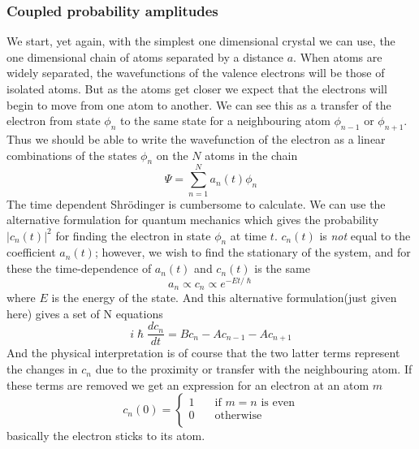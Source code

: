 \documentclass[11pt]{article}
\begin{document}
\subsubsection{Coupled probability amplitudes}
We start, yet again, with the simplest one dimensional crystal we can use, the one dimensional chain of atoms separated by a distance $a$. When atoms are widely separated, the wavefunctions of the valence electrons will be those of isolated atoms. But as the atoms get closer we expect that the electrons will begin to move from one atom to another. We can see this as a transfer of the electron from state $\phi_n$ to the same state for a neighbouring atom $\phi_{n-1}$ or $\phi_{n+1}$. Thus we should be able to write the wavefunction of the electron as a linear combinations of the states $\phi_n$ on the $N$ atoms in the chain
\begin{equation}
	\Psi = \sum^N_{n=1} a_n(t) \phi_n
\end{equation}
The time dependent Shrödinger is cumbersome to calculate. We can use the alternative formulation for quantum mechanics which gives the probability $|c_n(t)|^2$ for finding the electron in state $\phi_n$ at time $t$. $c_n(t)$ is \emph{not} equal to the coefficient $a_n(t)$; however, we wish to find the stationary of the system, and for these the time-dependence of $a_n(t)$ and $c_n(t)$ is the same
\begin{equation}
	a_n \propto c_n \propto e^{-Et/\hslash}
\end{equation}	
where $E$ is the energy of the state. And this alternative formulation(just given here) gives a set of N equations
\begin{equation}
	i\hslash \frac{dc_n}{dt} = Bc_n - Ac_{n-1} - Ac_{n+1}
	\label{eq:alternative-shrodinger}
\end{equation}
And the physical interpretation is of course that the two latter terms represent the changes in $c_n$ due to the proximity or transfer with the neighbouring atom. If these terms are removed we get an expression for an electron at an atom $m$
\[ c_n(0) =
  \begin{cases}
    1 & \quad \text{if } m=n \text{ is even}\\
    0 & \quad \text{otherwise} \\
  \end{cases}
\]
basically the electron sticks to its atom.
\end{document}
